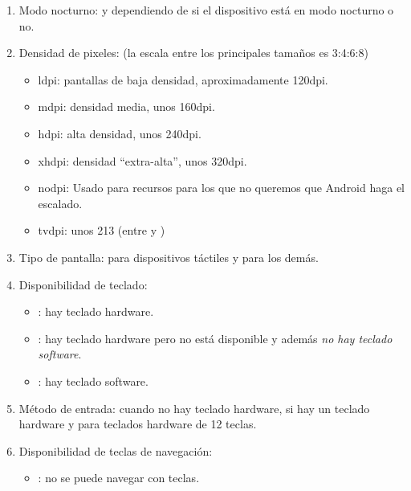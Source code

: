 \documentclass[a4paper,12pt,spanish]{sphinxmanual}
\begin{document}
\begin{enumerate}
\begin{itemize}
\end{itemize}

\item {} 
Modo nocturno:  y  dependiendo de si el dispositivo está en modo nocturno o no.

\item {} 
Densidad de pixeles: (la escala entre los principales tamaños es 3:4:6:8)
\begin{itemize}
\item {} 
ldpi: pantallas de baja densidad, aproximadamente 120dpi.

\item {} 
mdpi: densidad media, unos 160dpi.

\item {} 
hdpi: alta densidad, unos 240dpi.

\item {} 
xhdpi: densidad ``extra-alta'', unos 320dpi.

\item {} 
nodpi: Usado para recursos para los que no queremos que Android haga el escalado.

\item {} 
tvdpi: unos 213 (entre  y )

\end{itemize}

\item {} 
Tipo de pantalla:  para dispositivos táctiles y  para los demás.

\item {} 
Disponibilidad de teclado:
\begin{itemize}
\item {} 
: hay teclado hardware.

\item {} 
: hay teclado hardware pero no está disponible y además \emph{no hay teclado software}.

\item {} 
: hay teclado software.

\end{itemize}

\item {} 
Método de entrada:  cuando no hay teclado hardware,  si hay un teclado hardware y  para teclados hardware de 12 teclas.

\item {} 
Disponibilidad de teclas de navegación:
\begin{itemize}
\item {} 
: no se puede navegar con teclas.


\end{itemize}
\end{enumerate}
\end{document}
